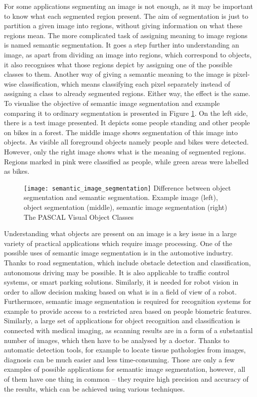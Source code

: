 For some applications segmenting an image is not enough, as it may be important to know what each segmented region present. The aim of segmentation is just to partition a given image into regions, without giving information on what these regions mean. The more complicated task of assigning meaning to image regions is named semantic segmentation. It goes a step further into understanding an image, as apart from dividing an image into regions, which correspond to objects, it also recognises what those regions depict by assigning one of the possible classes to them. Another way of giving a semantic meaning to the image is pixel-wise classification, which means classifying each pixel separately instead of assigning a class to already segmented regions.  Either way, the effect is the same. To visualise the objective of semantic image segmentation and example comparing it to ordinary segmentation is presented in Figure  \ref{fig:semantic_image_segmentation}. 
On the left side, there is a test image presented. It depicts some people standing and other people on bikes in a forest. The middle image shows segmentation of this image into objects. As visible all foreground objects namely people and bikes were detected. However, only the right image shows what is the meaning of segmented regions. Regions marked in pink were classified as people, while green areas were labelled as bikes. 
\begin{figure}[h]
    \texttt{[image: semantic\_image\_segmentation]}
    \captionsource
    {Difference between object segmentation and semantic segmentation. Example image (left), object segmentation (middle), semantic image segmentation (right)}
    {The PASCAL Visual Object Classes \cite{voc}}
     \label{fig:semantic_image_segmentation}
\end{figure}

Understanding what objects are present on an image is a key issue in a large variety of practical applications which require image processing. One of the possible uses of semantic image segmentation is in the automotive industry. Thanks to road segmentation, which include obstacle detection and classification, autonomous driving may be possible. It is also applicable to traffic control systems, or smart parking solutions. Similarly, it is needed for robot vision in order to allow decision making based on what is in a field of view of a robot.  Furthermore, semantic image segmentation is required for recognition systems for example to provide access to a restricted area based on people biometric features. Similarly, a large set of applications for object recognition and classification is connected with medical imaging, as scanning results are in a form of a substantial number of images, which then have to be analysed by a doctor. Thanks to automatic detection tools, for example to locate tissue pathologies from images, diagnosis can be much easier and less time-consuming.  Those are only a few examples of possible applications for semantic image segmentation, however, all of them have one thing in common – they require high precision and accuracy of the results, which can be achieved using various techniques. 
 
